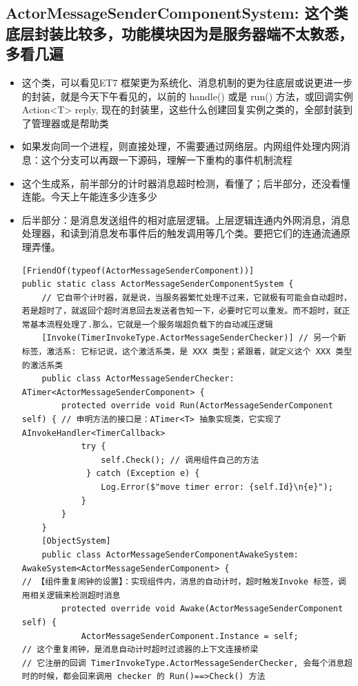 \documentclass[9pt, b5paper]{article}
\begin{document}
\subsection{ActorMessageSenderComponentSystem: 这个类底层封装比较多，功能模块因为是服务器端不太敦悉，多看几遍}
\label{sec-2-3}
\begin{itemize}
\item 这个类，可以看见ET7 框架更为系统化、消息机制的更为往底层或说更进一步的封装，就是今天下午看见的，以前的 handle() 或是 run() 方法，或回调实例 Action<T> reply, 现在的封装里，这些什么创建回复实例之类的，全部封装到了管理器或是帮助类
\item 如果发向同一个进程，则直接处理，不需要通过网络层。内网组件处理内网消息：这个分支可以再跟一下源码，理解一下重构的事件机制流程
\item 这个生成系，前半部分的计时器消息超时检测，看懂了；后半部分，还没看懂连能。今天上午能连多少连多少
\item 后半部分：是消息发送组件的相对底层逻辑。上层逻辑连通内外网消息，消息处理器，和读到消息发布事件后的触发调用等几个类。要把它们的连通流通原理弄懂。
\begin{verbatim}
[FriendOf(typeof(ActorMessageSenderComponent))]
public static class ActorMessageSenderComponentSystem {
    // 它自带个计时器，就是说，当服务器繁忙处理不过来，它就极有可能会自动超时，若是超时了，就返回个超时消息回去发送者告知一下，必要时它可以重发。而不超时，就正常基本流程处理了.那么，它就是一个服务端超负载下的自动减压逻辑
    [Invoke(TimerInvokeType.ActorMessageSenderChecker)] // 另一个新标签，激活系: 它标记说，这个激活系类，是 XXX 类型；紧跟着，就定义这个 XXX 类型的激活系类
    public class ActorMessageSenderChecker: ATimer<ActorMessageSenderComponent> {
        protected override void Run(ActorMessageSenderComponent self) { // 申明方法的接口是：ATimer<T> 抽象实现类，它实现了 AInvokeHandler<TimerCallback>
            try {
                self.Check(); // 调用组件自己的方法
             } catch (Exception e) {
                Log.Error($"move timer error: {self.Id}\n{e}");
            }
        }
    }
    [ObjectSystem]
    public class ActorMessageSenderComponentAwakeSystem: AwakeSystem<ActorMessageSenderComponent> {
// 【组件重复闹钟的设置】：实现组件内，消息的自动计时，超时触发Invoke 标签，调用相关逻辑来检测超时消息
        protected override void Awake(ActorMessageSenderComponent self) {
            ActorMessageSenderComponent.Instance = self;
// 这个重复闹钟，是消息自动计时超时过滤器的上下文连接桥梁
// 它注册的回调 TimerInvokeType.ActorMessageSenderChecker, 会每个消息超时的时候，都会回来调用 checker 的 Run()==>Check() 方法

\end{verbatim}
\end{itemize}
\end{document}
